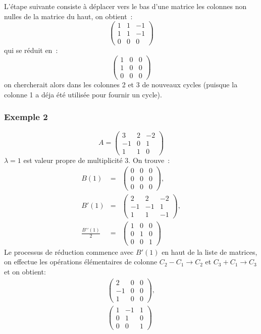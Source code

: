 \documentclass[a4paper,11pt]{article}
\begin{document}
L'\'etape suivante consiste \`a d\'eplacer vers le bas d'une matrice les
colonnes non nulles de la matrice du haut, on obtient~:
\[ \left(\begin{array}{ccc}
 1 & 1 & -1 \\
1 & 1 & -1\\
0 & 0 & 0 
\end{array}\right) \]
qui se r\'eduit en~:
\[ \left(\begin{array}{ccc}
 1 & 0 & 0 \\
1 & 0 & 0\\
0 & 0 & 0 
\end{array}\right) \]
on chercherait alors dans les colonnes 2 et 3 de nouveaux cycles (puisque
la colonne 1 a d\'eja \'et\'e utilis\'ee pour fournir un cycle).

\subsubsection{Exemple 2} \label{sec:ex2}
\[ A=\left(\begin{array}{ccc}
 3 & 2 & -2 \\
-1 &0 &1 \\
1 & 1 & 0 
\end{array}\right) \]
$\lambda =1$ est valeur propre de multiplicit\'e 3.
On trouve~:
\begin{eqnarray*}
B(1)&=&
\left(\begin{array}{ccc}
0 & 0 & 0 \\
0 & 0 & 0 \\
0 & 0 & 0 
\end{array}\right), \\
B'(1)&=&\left(\begin{array}{ccc}
2 & 2&-2 \\
-1 & -1 & 1 \\
1 & 1 & -1 
\end{array}\right), \\
\frac{ B'{'}(1)}{2}
&=& \left(\begin{array}{ccc}
1 & 0 & 0 \\
0 & 1 & 0 \\
0 & 0 & 1 
\end{array}\right)
\end{eqnarray*}
Le processus de r\'eduction commence avec $B'(1)$ en haut de la liste
de matrices, on effectue les op\'erations \'el\'ementaires de
colonne $C_2-C_1\rightarrow C_2$
et $C_3+C_1 \rightarrow C_3$ et on obtient:
\begin{eqnarray*}
\left(\begin{array}{ccc}
2 & 0&0 \\
-1 & 0 & 0 \\
1 & 0 & 0 
\end{array}\right), \\
 \left(\begin{array}{ccc}
1 & -1 & 1 \\
0 & 1 & 0 \\
0 & 0 & 1 
\end{array}\right)
\end{eqnarray*}
\end{document}
